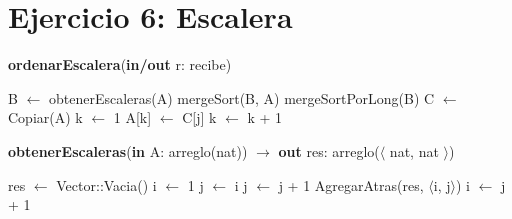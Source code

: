 \section{Ejercicio 6: Escalera}

\begin{algorithm}[H]
\caption{
    \textbf{ordenarEscalera}(\textbf{in/out} r: recibe)
}
    \begin{algorithmic}[1]
        \State B $\gets$ obtenerEscaleras(A)
        \State mergeSort(B, A) 
        \State mergeSortPorLong(B) 
        \State C $\gets$ Copiar(A)
        \State k $\gets$ 1
                \State A[k] $\gets$ C[j]
                \State k $\gets$ k + 1
            \EndFor
        \EndFor
    \end{algorithmic}
\end{algorithm}

\begin{algorithm}[H]
\caption{
    \textbf{obtenerEscaleras}(\textbf{in} A: arreglo(nat)) $\to$ \textbf{out} res: arreglo($\langle$ nat, nat $\rangle$) 
}
    \begin{algorithmic}[1]
        \State res $\gets$ Vector::Vacia()
        \State i $\gets$ 1
             \State j $\gets$ i
                \State j $\gets$ j + 1
            \EndWhile
                \State AgregarAtras(res, $\langle$i, j$\rangle$)
                \State i $\gets$ j + 1
        \EndWhile
    \end{algorithmic}
\end{algorithm}
